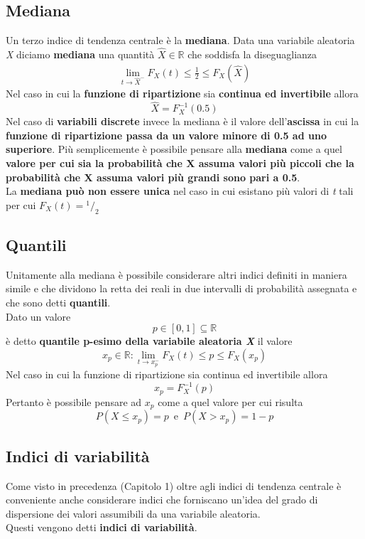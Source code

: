 \subsection{Mediana}
Un terzo indice di tendenza centrale è la \textbf{mediana}. Data una variabile aleatoria \textit{X} diciamo \textbf{mediana} una quantità $\hat{X} \in \mathbb{R}$ che soddisfa la diseguaglianza 
\begin{align*}
\lim_{t \to \hat{X}^-} F_X(t) \le \frac{1}{2} \le F_X(\hat{X})
\end{align*}
Nel caso in cui la \textbf{funzione di ripartizione} sia \textbf{continua ed invertibile} allora \[
\hat{X} = F_X^{-1} (0.5)
\]
Nel caso di \textbf{variabili discrete} invece la mediana è il valore dell’\textbf{ascissa} in cui la
\textbf{funzione di ripartizione passa da un valore minore di 0.5 ad uno superiore}.
Più semplicemente è possibile pensare alla \textbf{mediana }come a quel \textbf{valore per cui sia
la probabilità che X assuma valori più piccoli che la probabilità che X assuma valori
più grandi sono pari a 0.5}.\\
La\textbf{ mediana può non essere unica} nel caso in cui esistano più valori di \textit{t} tali per cui \(F_X(t) = {}^1/_2\)

\subsection{Quantili}
Unitamente alla mediana è possibile considerare altri indici definiti in maniera
simile e che dividono la retta dei reali in due intervalli di probabilità assegnata e
che sono detti \textbf{quantili}.\\
Dato un valore 
\[
p \in [0, 1] \subseteq \mathbb{R}
\]
è detto \textbf{quantile p-esimo della variabile aleatoria \textit{X}} il valore 
\[
x_p \in \mathbb{R}: \lim_{t \to x_p^-} F_X(t) \le p \le F_X(x_p)
\]
Nel caso in cui la funzione di ripartizione sia continua ed invertibile allora
\[
x_p = F_X^{-1} (p)
\]
Pertanto è possibile pensare ad \(x_p\) come a quel valore per cui risulta
\[
P(X \le x_p) = p \, \text{ e } \, P(X > x_p) = 1 - p
\]

\subsection{Indici di variabilità}
Come visto in precedenza (Capitolo 1) oltre agli indici di tendenza centrale è
conveniente anche considerare indici che forniscano un’idea del grado di dispersione
dei valori assumibili da una variabile aleatoria.\\
Questi vengono detti \textbf{indici di variabilità}.

